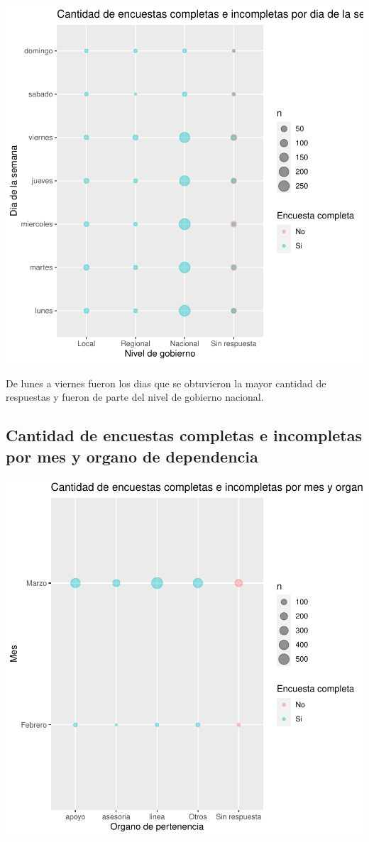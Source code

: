 \documentclass{article}
\begin{document}
\includegraphics{seguimientov3-055}

De lunes a viernes fueron los dias que se obtuvieron la mayor cantidad de respuestas y fueron de parte del nivel de gobierno nacional.

\subsection{Cantidad de encuestas completas e incompletas por mes y organo de dependencia}

\includegraphics{seguimientov3-056}
\end{document}
